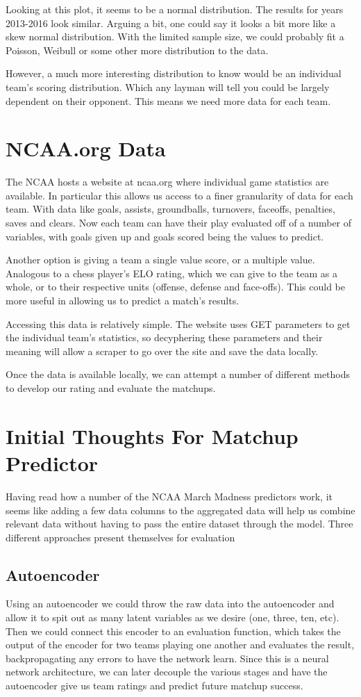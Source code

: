 \documentclass[11pt,a4paper]{article}
\begin{document}
Looking at this plot, it seems to be a normal distribution. The results for years 2013-2016 look similar. Arguing a bit, one could say it looks a bit more like a skew normal distribution. With the limited sample size, we could probably fit a Poisson, Weibull or some other more distribution to the data. 

However, a much more interesting distribution to know would be an individual team's scoring distribution. Which any layman will tell you could be largely dependent on their opponent. This means we need more data for each team.

\section*{NCAA.org Data}
The NCAA hosts a website at ncaa.org where individual game statistics are available. In particular this allows us access to a finer granularity of data for each team. With data like goals, assists, groundballs, turnovers, faceoffs, penalties, saves and clears. Now each team can have their play evaluated off of a number of variables, with goals given up and goals scored being the values to predict. 

Another option is giving a team a single value score, or a multiple value. Analogous to a chess player's ELO rating, which we can give to the team as a whole, or to their respective units (offense, defense and face-offs). This could be more useful in allowing us to predict a match's results.

Accessing this data is relatively simple. The website uses GET parameters to get the individual team's statistics, so decyphering these parameters and their meaning will allow a scraper to go over the site and save the data locally.

Once the data is available locally, we can attempt a number of different methods to develop our rating and evaluate the matchups. 

\section*{Initial Thoughts For Matchup Predictor}
Having read how a number of the NCAA March Madness predictors work, it seems like adding a few data columns to the aggregated data will help us combine relevant data without having to pass the entire dataset through the model. 
Three different approaches present themselves for evaluation 
\subsection*{Autoencoder} 
Using an autoencoder we could throw the raw data into the autoencoder and allow it to spit out as many latent variables as we desire (one, three, ten, etc). Then we could connect this encoder to an evaluation function, which takes the output of the encoder for two teams playing one another and evaluates the result, backpropagating any errors to have the network learn. 
Since this is a neural network architecture, we can later decouple the various stages and have the autoencoder give us team ratings and predict future matchup success.
\end{document}
